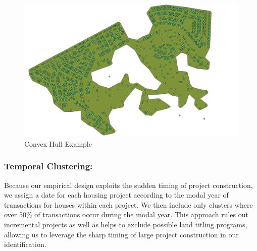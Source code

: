 \documentclass[12pt]{article}
\begin{document}
\begin{figure}
\caption{Convex Hull Example}\label{figure:conhull}
\centering
\includegraphics[scale=.27]{figures/rdp_conhull_pic.png}
\end{figure}

\subsubsection{Temporal Clustering:}  Because our empirical design exploits the sudden timing of project construction, we assign a date for each housing project according to the modal year of transactions for houses within each project.  We then include only clusters where over 50\% of transactions occur during the modal year.  This approach rules out incremental projects as well as helps to exclude possible land titling programs, allowing us to leverage the sharp timing of large project construction in our identification.  
\end{document}
